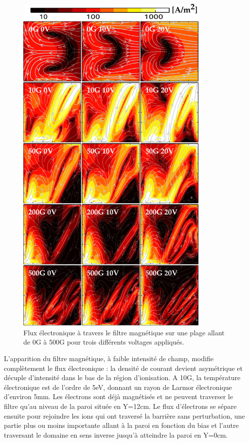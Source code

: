 \begin{refsection}
 \begin{figure}[!htbp]
	\centering
	\includegraphics[width=0.85\textwidth]{figures/4-pegasesfluxElectronique.pdf}
	{\caption{Flux électronique à travers le filtre magnétique sur une plage
	allant de 0G à 500G pour trois différents voltages appliqués.}
	\label{4-pegasesfluxElectronique}}
	\end{figure}
	
L'apparition du filtre magnétique, à faible intensité de champ, modifie
complètement le flux électronique : la densité de courant devient asymétrique et
décuple d'intensité dans le bas de la région d'ionisation. A 10G, la
température électronique est de l'ordre de 5eV, donnant un rayon de Larmor
électronique d'environ 5mm. Les électrons sont déjà magnétisés et ne peuvent
traverser le filtre qu'au niveau de la paroi située en Y=12cm. Le flux
d'électrons se sépare ensuite pour rejoindre les ions qui ont traversé la
barrière sans perturbation, une partie plus ou moins importante allant à la
paroi en fonction du bias et l'autre traversant le domaine en sens inverse
jusqu'à atteindre la paroi en Y=0cm.


\end{refsection}
